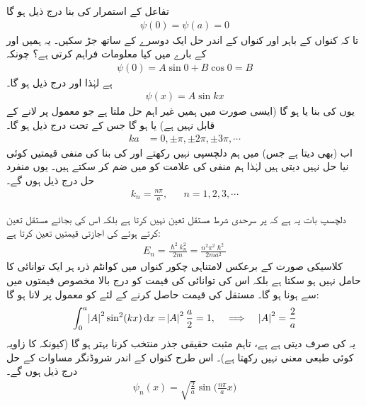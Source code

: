 تفاعل  کے استمرار کی بنا درج ذیل ہو گا
\begin{align}
\psi(0)=\psi(a)=0
\end{align} 
تا کہ کنواں کے باہر اور کنواں کے اندر حل ایک دوسرے کے ساتھ جڑ سکیں۔ یہ ہمیں  اور  کے بارے میں کیا معلومات فراہم کرتی ہے؟ چونکہ
\begin{align*}
\psi(0)=A\sin 0+B\cos 0=B
\end{align*}
ہے لہٰذا   اور درج ذیل ہو گا۔
\begin{align}
\psi(x)=A\sin kx
\end{align}
یوں   کی بنا یا    ہو گا (ایسی صورت میں ہمیں غیر اہم حل   ملتا ہے جو معمول پر لانے کے قابل نہیں ہے)  یا   ہو گا جس کے تحت درج ذیل ہو گا۔
\begin{align}
ka&=0,\pm\pi,\pm2\pi,\pm3\pi,\cdots
\end{align} 
اب   (بھی   دیتا ہے جس) میں ہم دلچسپی نہیں رکھتے اور    کی بنا  کی منفی قیمتیں کوئی نیا حل نہیں دیتی ہیں  لہٰذا ہم منفی کی علامت کو   میں ضم کر سکتے ہیں۔ یوں منفرد حل درج ذیل ہوں گے۔ 
\begin{align}
k_{n}=\frac{n\pi}{a},&& n=1,2,3,\cdots
\end{align}

دلچسپ بات یہ ہے کہ  پر سرحدی شرط مستقل    تعین نہیں کرتا ہے بلکہ اس کی بجائے مستقل تعین کرتے ہوئے     کی اجازتی قیمتیں تعین کرتا ہے:
\begin{align}\label{مساوات_شروڈنگر_لامتناہی_چکور_کنواں_توانائیاں}
E_{n}=\frac{\hslash^2 k^{2}_{n}}{2m}=\frac{n^{2}\pi^{2}\hslash^{2}}{2ma^{2}}
\end{align} 
کلاسیکی صورت کے برعکس لامتناہی چکور  کنواں میں کوانٹم ذرہ ہر ایک توانائی کا حامل نہیں ہو سکتا ہے بلکہ اس کی توانائی کی قیمت کو درج بالا مخصوص  قیمتوں  میں سے ہونا ہو گا۔ مستقل   کی قیمت حاصل کرنے کے لئے  کو معمول پر لانا ہو گا: 
\begin{align*}
\int_{0}^{a}\abs{A}^{2}\sin^{2}(kx)\dif{x}=\abs{A}^{2}\frac{a}{2}=1,\quad \implies\quad \abs{A}^{2}=\frac{2}{a}
\end{align*} 
یہ   کی صرف  دیتی ہے ہے، تاہم مثبت حقیقی جذر   منتخب کرنا بہتر ہو گا (کیونکہ   کا زاویہ کوئی طبعی معنی نہیں رکھتا ہے)۔  اس طرح کنواں کے اندر شروڈنگر مساوات کے حل درج ذیل ہوں گے۔
\begin{align}\label{مساوات_شروڈنگر_میری_سائے}
\psi_{n}(x)=\sqrt{\frac{2}{a}}\sin\big(\frac{n\pi}{a}x\big)
\end{align}

